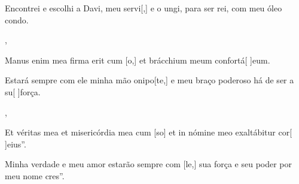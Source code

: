 {    {\item {}Encontrei e escolhi a Davi, meu servi[,] e o ungi, para ser rei, com meu óleo condo.~\Responsorium},
  {\item {}Manus enim mea firma erit cum [o,] et brácchium meum confortá[ ]{e}um.~\Responsorium}%
    {\item {}Estará sempre com ele minha mão onipo[te,] e meu braço poderoso há de ser a su[ ]{for}ça.~\Responsorium},
  {\item {}Et véritas mea et misericórdia mea cum [so] et in nómine meo exaltábitur cor[ ]{e}ius''.~\Responsorium}%
    {\item {}Minha verdade e meu amor estarão sempre com [le,] sua força e seu poder por meu nome cres''.~\Responsorium}
}